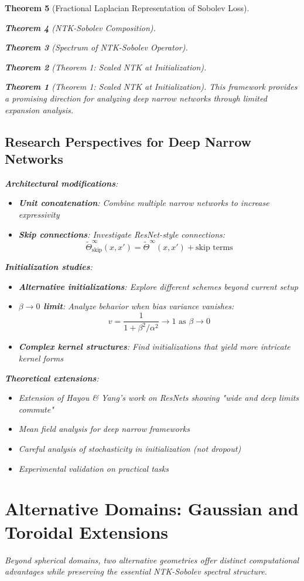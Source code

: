 \documentclass{article}
\newtheorem{theorem}{Theorem}[section]
\begin{document}
\begin{theorem}[Fractional Laplacian Representation of Sobolev Loss]
\begin{theorem}[NTK-Sobolev Composition]
\begin{theorem}[Spectrum of NTK-Sobolev Operator]
\begin{theorem}[Theorem 1: Scaled NTK at Initialization]
\begin{theorem}[Theorem 1: Scaled NTK at Initialization]
This framework provides a promising direction for analyzing deep narrow networks through limited expansion analysis.

\subsection{Research Perspectives for Deep Narrow Networks}

\textbf{Architectural modifications}:
   \begin{itemize}
\item \textbf{Unit concatenation}: Combine multiple narrow networks to increase expressivity
\item \textbf{Skip connections}: Investigate ResNet-style connections:
  \[ \tilde{\Theta}^\infty_{\text{skip}}(x, x') = \tilde{\Theta}^\infty(x, x') + \text{skip terms} \]
   \end{itemize}

\textbf{Initialization studies}:
\begin{itemize}
\item \textbf{Alternative initializations}: Explore different schemes beyond current setup
\item \textbf{$\beta \to 0$ limit}: Analyze behavior when bias variance vanishes:
  \[ v = \frac{1}{1 + \beta^2/\alpha^2} \to 1 \text{ as } \beta \to 0 \]
\item \textbf{Complex kernel structures}: Find initializations that yield more intricate kernel forms
\end{itemize}

\textbf{Theoretical extensions}:
\begin{itemize}
\item Extension of Hayou \& Yang's work on ResNets showing "wide and deep limits commute"
\item Mean field analysis for deep narrow frameworks
\item Careful analysis of stochasticity in initialization (not dropout)
\item Experimental validation on practical tasks
\end{itemize}

\section{Alternative Domains: Gaussian and Toroidal Extensions}

Beyond spherical domains, two alternative geometries offer distinct computational advantages while preserving the essential NTK-Sobolev spectral structure.


\end{theorem}
\end{theorem}
\end{theorem}
\end{theorem}
\end{theorem}
\end{document}

